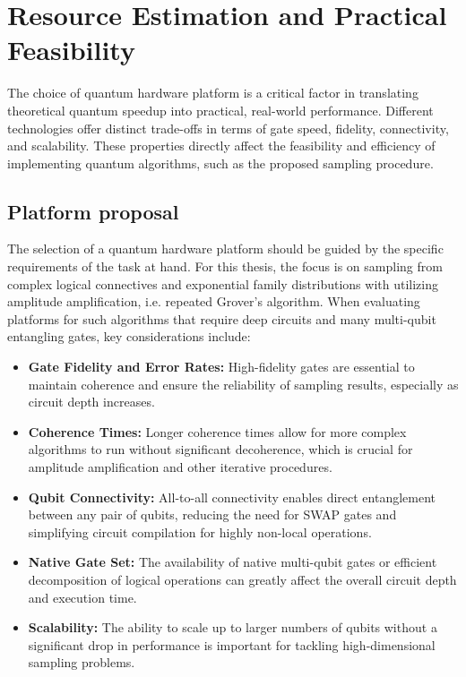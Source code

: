 \documentclass[encoding=utf8,british]{tumphthesis}
\begin{document}
\section{Resource Estimation and Practical Feasibility}
The choice of quantum hardware platform is a critical factor in translating theoretical quantum speedup into practical, 
real-world performance. Different technologies offer distinct trade-offs in terms of gate speed, fidelity, connectivity,
and scalability. These properties directly affect the feasibility and efficiency of implementing quantum algorithms, such as 
the proposed sampling procedure.
    \subsection{Platform proposal}
    The selection of a quantum hardware platform should be guided by the specific requirements of the task at hand. For this 
    thesis, the focus is on sampling from complex logical connectives and exponential family distributions with utilizing 
    amplitude amplification, i.e. repeated Grover's algorithm. When evaluating platforms for such algorithms that
    require deep circuits and many multi-qubit entangling gates, key considerations include:

    \begin{itemize}
        \item \textbf{Gate Fidelity and Error Rates:} High-fidelity gates are essential to maintain coherence and ensure the 
        reliability of sampling results, especially as circuit depth increases.
        \item \textbf{Coherence Times:} Longer coherence times allow for more complex algorithms to run without significant 
        decoherence, which is crucial for amplitude amplification and other iterative procedures.
        \item \textbf{Qubit Connectivity:} All-to-all connectivity enables direct entanglement between any pair of qubits, 
        reducing the need for SWAP gates and simplifying circuit compilation for highly non-local operations.
        \item \textbf{Native Gate Set:} The availability of native multi-qubit gates or efficient decomposition of logical 
        operations can greatly affect the overall circuit depth and execution time.
        \item \textbf{Scalability:} The ability to scale up to larger numbers of qubits without a significant drop in 
        performance is important for tackling high-dimensional sampling problems.
    \end{itemize}
\end{document}
